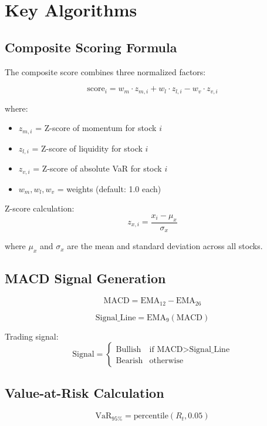 \documentclass[11pt, a4paper, twoside]{article}
\begin{document}
\newpage
\appendix

\section{Key Algorithms}
\label{app:algorithms}

\subsection{Composite Scoring Formula}

The composite score combines three normalized factors:

\[
\text{score}_i = w_m \cdot z_{m,i} + w_l \cdot z_{l,i} - w_v \cdot z_{v,i}
\]

where:
\begin{itemize}
    \item $z_{m,i}$ = Z-score of momentum for stock $i$
    \item $z_{l,i}$ = Z-score of liquidity for stock $i$
    \item $z_{v,i}$ = Z-score of absolute VaR for stock $i$
    \item $w_m, w_l, w_v$ = weights (default: 1.0 each)
\end{itemize}

Z-score calculation:
\[
z_{x,i} = \frac{x_i - \mu_x}{\sigma_x}
\]

where $\mu_x$ and $\sigma_x$ are the mean and standard deviation across all stocks.

\subsection{MACD Signal Generation}

\[
\text{MACD} = \text{EMA}_{12} - \text{EMA}_{26}
\]

\[
\text{Signal\_Line} = \text{EMA}_9(\text{MACD})
\]

Trading signal:
\[
\text{Signal} = \begin{cases}
\text{Bullish} & \text{if } \text{MACD} > \text{Signal\_Line} \\
\text{Bearish} & \text{otherwise}
\end{cases}
\]

\subsection{Value-at-Risk Calculation}

\[
\text{VaR}_{95\%} = \text{percentile}(R_t, 0.05)
\]
\end{document}
